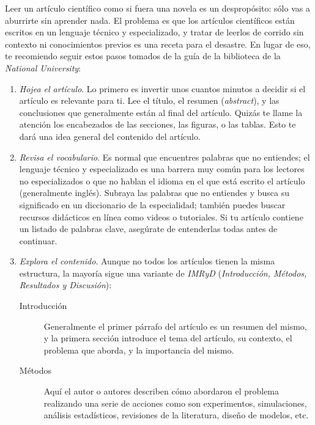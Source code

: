 Leer un artículo científico como si fuera una novela es un despropósito: sólo
vas a aburrirte sin aprender nada.
El problema es que los artículos científicos están escritos en un lenguaje
técnico y especializado, y tratar de leerlos de corrido sin contexto ni
conocimientos previos es una receta para el desastre.
En lugar de eso, te recomiendo seguir estos pasos tomados de la guía de la
biblioteca de la \emph{National University}\cite{NationalUniversity2024}:

\begin{enumerate}
  \item \emph{Hojea el artículo}. Lo primero es invertir unos cuantos minutos
        a decidir si el artículo es relevante para ti.
        Lee el título, el resumen (\emph{abstract}), y las conclusiones que
        generalmente están al final del artículo.
        Quizás te llame la atención los encabezados de las secciones, las
        figuras, o las tablas.
        Esto te dará una idea general del contenido del artículo.
  \item \emph{Revisa el vocabulario}. Es normal que encuentres palabras que no
        entiendes; el lenguaje técnico y especializado es una barrera muy común
        para los lectores no especializados o que no hablan el idioma en el que
        está escrito el artículo (generalmente inglés).
        Subraya las palabras que no entiendes y busca su significado en un
        diccionario de la especialidad; también puedes buscar recursos
        didácticos en línea como videos o tutoriales.
        Si tu artículo contiene un listado de palabras clave, asegúrate de
        entenderlas todas antes de continuar.
  \item \emph{Explora el contenido}. Aunque no todos los artículos tienen la
        misma estructura, la mayoría sigue una variante de \emph{IMRyD}
        (\emph{Introducción, Métodos, Resultados y Discusión}):
        \begin{description}
          \item[Introducción] Generalmente el primer párrafo del artículo es
            un resumen del mismo, y la primera sección introduce el tema
            del artículo, su contexto, el problema que aborda, y la
            importancia del mismo.
          \item[Métodos] Aquí el autor o autores describen cómo abordaron el
            problema realizando una serie de acciones como son
            experimentos, simulaciones, análisis estadísticos, revisiones
            de la literatura, diseño de modelos, etc.

\end{description}
\end{enumerate}
